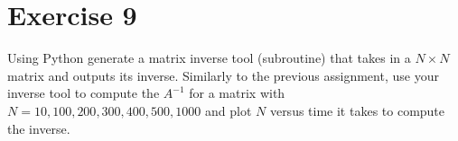 \documentclass[12pt]{article}
\begin{document}
\section{Exercise 9}
Using Python generate a matrix inverse tool (subroutine) that takes in a $N
\times N$ matrix and outputs its inverse. Similarly to the previous
assignment, use your inverse tool to compute the $A^{-1}$ for a matrix
with $N=10, 100, 200, 300, 400, 500, 1000$ and plot $N$ versus time it
takes to compute the inverse.


    
\end{document}
